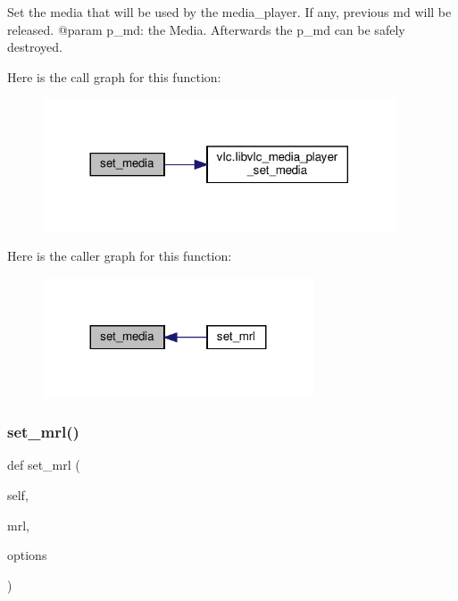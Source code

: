 \begin{DoxyVerb}Set the media that will be used by the media_player. If any,
previous md will be released.
@param p_md: the Media. Afterwards the p_md can be safely destroyed.
\end{DoxyVerb}
 Here is the call graph for this function\+:
\nopagebreak
\begin{figure}[H]
\begin{center}
\leavevmode
\includegraphics[width=296pt]{classvlc_1_1_media_player_a8d4d4151676c2941cdd0cee4e25648c5_cgraph}
\end{center}
\end{figure}
Here is the caller graph for this function\+:
\nopagebreak
\begin{figure}[H]
\begin{center}
\leavevmode
\includegraphics[width=227pt]{classvlc_1_1_media_player_a8d4d4151676c2941cdd0cee4e25648c5_icgraph}
\end{center}
\end{figure}
\mbox{\label{classvlc_1_1_media_player_a2c4747c725843bd4ab289d7288838369}} 
\subsubsection{\texorpdfstring{set\+\_\+mrl()}{set\_mrl()}}
{\footnotesize\ttfamily def set\+\_\+mrl (\begin{DoxyParamCaption}\item[{}]{self,  }\item[{}]{mrl,  }\item[{}]{options }\end{DoxyParamCaption})}


